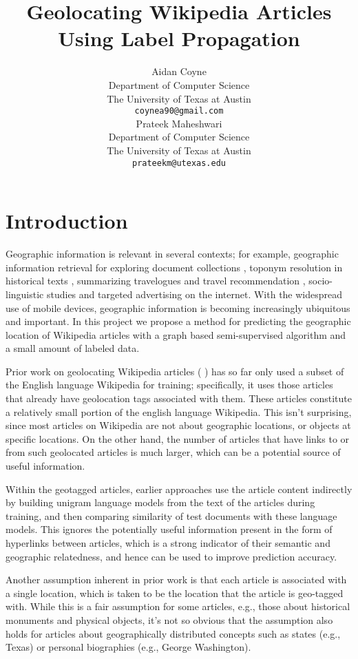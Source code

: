 \documentclass[11pt]{article}
\title{Geolocating Wikipedia Articles Using Label Propagation}
\author{
  Aidan Coyne \\
    Department of Computer Science\\
    The University of Texas at Austin\\
  {\tt coynea90@gmail.com} \\ 
  \And
  Prateek Maheshwari\\
    Department of Computer Science\\
    The University of Texas at Austin\\
  {\tt prateekm@utexas.edu}
}
\date{}
\newcommand{\comment}[1]{}
\begin{document}
\maketitle



\section{Introduction}
\comment{You can now enclose text in a comment block to comment it out inline}
Geographic information is relevant in several contexts; for example, geographic information retrieval for exploring document collections \cite{ding2000computing}, toponym resolution in historical texts \cite{smith2001disambiguating}, summarizing travelogues and travel recommendation \cite{hao-et-al:10}, socio-linguistic studies \cite{eisenstein-smith-xing:11} and targeted advertising on the internet. With the widespread use of mobile devices, geographic information is becoming increasingly ubiquitous and important. In this project we propose a method for predicting the geographic location of Wikipedia articles with a graph based semi-supervised algorithm and a small amount of labeled data.

Prior work on geolocating Wikipedia articles (\cite{wing-baldridge:11} \cite{rolleretal:12}) has so far only used a subset of the English language Wikipedia for training; specifically, it uses those articles that already have geolocation tags associated with them. These articles constitute a relatively small portion of the english language Wikipedia. \comment{find actual figure} This isn't surprising, since most articles on Wikipedia are not about geographic locations, or objects at specific locations. On the other hand, the number of articles that have links to or from such geolocated articles is much larger, which can be a potential source of useful information. \comment{ find actual figure}

Within the geotagged articles, earlier approaches use the article content indirectly by building unigram language models from the text of the articles during training, and then comparing similarity of test documents with these language models. This ignores the potentially useful information present in the form of hyperlinks between articles, which is a strong indicator of their semantic and geographic relatedness, and hence can be used to improve prediction accuracy.

Another assumption inherent in prior work is that each article is associated with a single location, which is taken to be the location that the article is geo-tagged with. While this is a fair assumption for some articles, e.g., those about historical monuments and physical objects, it's not so obvious that the assumption also holds for articles about geographically distributed concepts such as states (e.g., Texas) or personal biographies (e.g., George Washington). 
\end{document}
